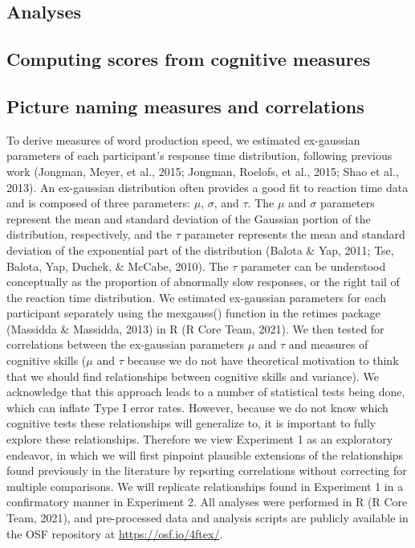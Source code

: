 \documentclass[
  man,floatsintext]{apa6}
\begin{document}
\hypertarget{analyses}{%
\subsection{Analyses}\label{analyses}}

\hypertarget{computing-scores-from-cognitive-measures}{%
\subsection{Computing scores from cognitive measures}\label{computing-scores-from-cognitive-measures}}

\hypertarget{picture-naming-measures-and-correlations}{%
\subsection{Picture naming measures and correlations}\label{picture-naming-measures-and-correlations}}

To derive measures of word production speed, we estimated ex-gaussian parameters of each participant's response time distribution, following previous work (Jongman, Meyer, et al., 2015; Jongman, Roelofs, et al., 2015; Shao et al., 2013). An ex-gaussian distribution often provides a good fit to reaction time data and is composed of three parameters: \(\mu\), \(\sigma\), and \(\tau\). The \(\mu\) and \(\sigma\) parameters represent the mean and standard deviation of the Gaussian portion of the distribution, respectively, and the \(\tau\) parameter represents the mean and standard deviation of the exponential part of the distribution (Balota \& Yap, 2011; Tse, Balota, Yap, Duchek, \& McCabe, 2010). The \(\tau\) parameter can be understood conceptually as the proportion of abnormally slow responses, or the right tail of the reaction time distribution. We estimated ex-gaussian parameters for each participant separately using the mexgauss() function in the retimes package (Massidda \& Massidda, 2013) in R (R Core Team, 2021). We then tested for correlations between the ex-gaussian parameters \(\mu\) and \(\tau\) and measures of cognitive skills (\(\mu\) and \(\tau\) because we do not have theoretical motivation to think that we should find relationships between cognitive skills and variance). We acknowledge that this approach leads to a number of statistical tests being done, which can inflate Type I error rates. However, because we do not know which cognitive tests these relationships will generalize to, it is important to fully explore these relationships. Therefore we view Experiment 1 as an exploratory endeavor, in which we will first pinpoint plausible extensions of the relationships found previously in the literature by reporting correlations without correcting for multiple comparisons. We will replicate relationships found in Experiment 1 in a confirmatory manner in Experiment 2. All analyses were performed in R (R Core Team, 2021), and pre-processed data and analysis scripts are publicly available in the OSF repository at \url{https://osf.io/4ftex/}.
\end{document}
